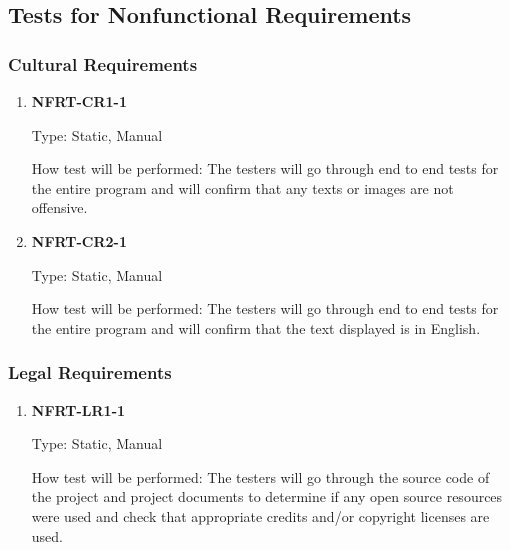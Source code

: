 \documentclass[12pt, titlepage]{article}
\begin{document}
\subsection{Tests for Nonfunctional Requirements}




\subsubsection{Cultural Requirements}
\begin{enumerate}
	\item \textbf{NFRT-CR1-1}

	      Type: Static, Manual

	      How test will be performed: The testers will go through end to end tests for the entire program and
	      will confirm that any texts or images are not offensive.

	\item \textbf{NFRT-CR2-1}

	      Type: Static, Manual

	      How test will be performed: The testers will go through end to end tests for the entire program and
	      will confirm that the text displayed is in English.

\end{enumerate}

\subsubsection{Legal Requirements}
\begin{enumerate}
	\item \textbf{NFRT-LR1-1}

	      Type: Static, Manual

	      How test will be performed: The testers will go through the source code of the project and project
	      documents to determine if any open source resources were used and check that appropriate credits
	      and/or copyright licenses are used.

\end{enumerate}
\end{document}
